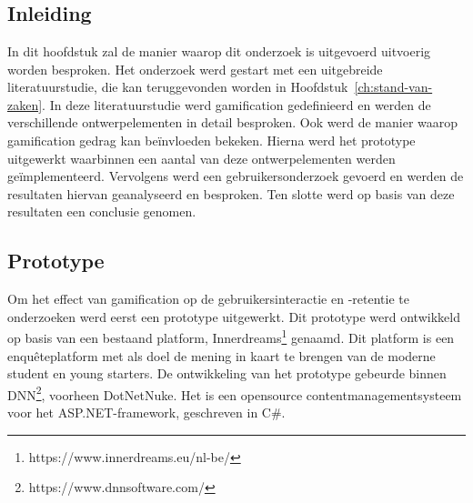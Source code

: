 
\chapter{}
\label{ch:methodologie}


\section{Inleiding}

In dit hoofdstuk zal de manier waarop dit onderzoek is uitgevoerd uitvoerig worden besproken. Het onderzoek werd gestart met een uitgebreide literatuurstudie, die kan teruggevonden worden in Hoofdstuk~\ref{ch:stand-van-zaken}. In deze literatuurstudie werd gamification gedefinieerd en werden de verschillende ontwerpelementen in detail besproken. Ook werd de manier waarop gamification gedrag kan beïnvloeden bekeken. Hierna werd het prototype uitgewerkt waarbinnen een aantal van deze ontwerpelementen werden geïmplementeerd. Vervolgens werd een gebruikersonderzoek gevoerd en werden de resultaten hiervan geanalyseerd en besproken. Ten slotte werd op basis van deze resultaten een conclusie genomen.

\section{Prototype}

Om het effect van gamification op de gebruikersinteractie en -retentie te onderzoeken werd eerst een prototype uitgewerkt. Dit prototype werd ontwikkeld op basis van een bestaand platform, Innerdreams\footnote{https://www.innerdreams.eu/nl-be/} genaamd. Dit platform is een enquêteplatform met als doel de mening in kaart te brengen van de moderne student en young starters. De ontwikkeling van het prototype gebeurde binnen DNN\footnote{https://www.dnnsoftware.com/}, voorheen DotNetNuke. Het is een opensource contentmanagementsysteem voor het ASP.NET-framework, geschreven in C\#.

